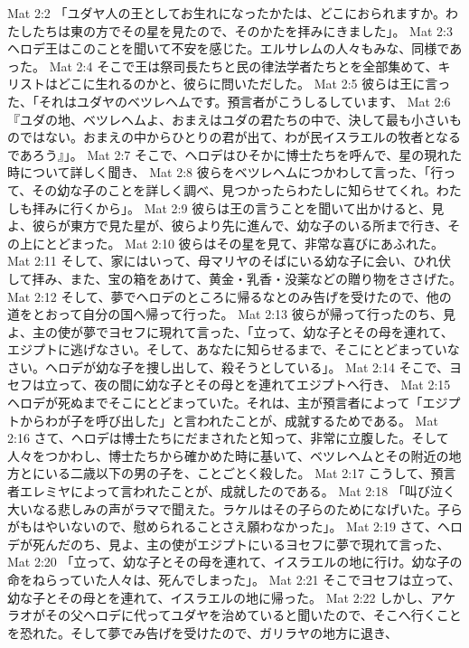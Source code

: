 Mat 2:2  「ユダヤ人の王としてお生れになったかたは、どこにおられますか。わたしたちは東の方でその星を見たので、そのかたを拝みにきました」。
Mat 2:3  ヘロデ王はこのことを聞いて不安を感じた。エルサレムの人々もみな、同様であった。
Mat 2:4  そこで王は祭司長たちと民の律法学者たちとを全部集めて、キリストはどこに生れるのかと、彼らに問いただした。
Mat 2:5  彼らは王に言った、「それはユダヤのベツレヘムです。預言者がこうしるしています、
Mat 2:6  『ユダの地、ベツレヘムよ、おまえはユダの君たちの中で、決して最も小さいものではない。おまえの中からひとりの君が出て、わが民イスラエルの牧者となるであろう』」。
Mat 2:7  そこで、ヘロデはひそかに博士たちを呼んで、星の現れた時について詳しく聞き、
Mat 2:8  彼らをベツレヘムにつかわして言った、「行って、その幼な子のことを詳しく調べ、見つかったらわたしに知らせてくれ。わたしも拝みに行くから」。
Mat 2:9  彼らは王の言うことを聞いて出かけると、見よ、彼らが東方で見た星が、彼らより先に進んで、幼な子のいる所まで行き、その上にとどまった。
Mat 2:10  彼らはその星を見て、非常な喜びにあふれた。
Mat 2:11  そして、家にはいって、母マリヤのそばにいる幼な子に会い、ひれ伏して拝み、また、宝の箱をあけて、黄金・乳香・没薬などの贈り物をささげた。
Mat 2:12  そして、夢でヘロデのところに帰るなとのみ告げを受けたので、他の道をとおって自分の国へ帰って行った。
Mat 2:13  彼らが帰って行ったのち、見よ、主の使が夢でヨセフに現れて言った、「立って、幼な子とその母を連れて、エジプトに逃げなさい。そして、あなたに知らせるまで、そこにとどまっていなさい。ヘロデが幼な子を捜し出して、殺そうとしている」。
Mat 2:14  そこで、ヨセフは立って、夜の間に幼な子とその母とを連れてエジプトへ行き、
Mat 2:15  ヘロデが死ぬまでそこにとどまっていた。それは、主が預言者によって「エジプトからわが子を呼び出した」と言われたことが、成就するためである。
Mat 2:16  さて、ヘロデは博士たちにだまされたと知って、非常に立腹した。そして人々をつかわし、博士たちから確かめた時に基いて、ベツレヘムとその附近の地方とにいる二歳以下の男の子を、ことごとく殺した。
Mat 2:17  こうして、預言者エレミヤによって言われたことが、成就したのである。
Mat 2:18  「叫び泣く大いなる悲しみの声がラマで聞えた。ラケルはその子らのためになげいた。子らがもはやいないので、慰められることさえ願わなかった」。
Mat 2:19  さて、ヘロデが死んだのち、見よ、主の使がエジプトにいるヨセフに夢で現れて言った、
Mat 2:20  「立って、幼な子とその母を連れて、イスラエルの地に行け。幼な子の命をねらっていた人々は、死んでしまった」。
Mat 2:21  そこでヨセフは立って、幼な子とその母とを連れて、イスラエルの地に帰った。
Mat 2:22  しかし、アケラオがその父ヘロデに代ってユダヤを治めていると聞いたので、そこへ行くことを恐れた。そして夢でみ告げを受けたので、ガリラヤの地方に退き、
